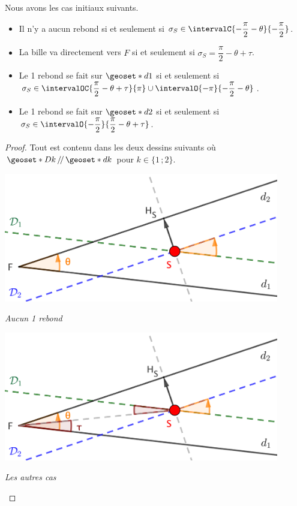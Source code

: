 \begin{fact}
	Nous avons les cas initiaux suivants.
	
	\begin{itemize}[label = \small\textbullet]
		\item Il n'y a aucun rebond si et seulement si $\sigma_S \in \intervalC{- \dfrac{\pi}{2} - \theta}{- \dfrac{\pi}{2}}$.
		
		\item La bille va directement vers $F$ si et seulement si $\sigma_S = \dfrac{\pi}{2} - \theta + \tau$.

		\item Le 1\ier{} rebond se fait sur $\geoset*{d}{1}$ si et seulement si $\sigma_S \in \intervalOC{\dfrac{\pi}{2} - \theta + \tau}{\pi} \cup \intervalO{- \pi}{- \dfrac{\pi}{2} - \theta}$.

		\item Le 1\ier{} rebond se fait sur $\geoset*{d}{2}$ si et seulement si $\sigma_S \in \intervalO{- \dfrac{\pi}{2}}{\dfrac{\pi}{2} - \theta + \tau}$.
	\end{itemize}

\end{fact}

\begin{proof}
	Tout est contenu dans les deux dessins suivants où $\geoset*{D}{k} \, /\!/ \, \geoset*{d}{k}$ pour $k \in \{ 1 \,; 2\}$.

	\medskip

	\begin{center}
		\includegraphics[width=12cm]{basic-math-pool/proof-no-bounce.png}

		\itshape\small
		Aucun 1\ier{} rebond
	\end{center}

	\medskip

	\begin{center}
		\includegraphics[width=12cm]{basic-math-pool/proof-1st-bounce-somewhere.png}

		\itshape\small
		Les autres cas
	\end{center}
\end{proof}


